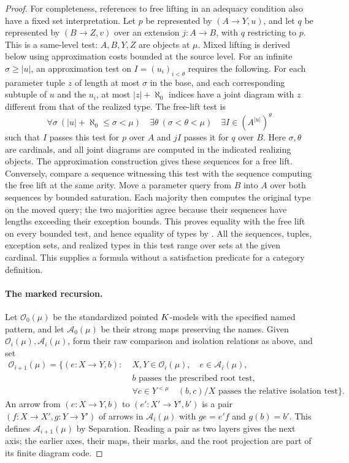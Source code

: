 \begin{proof}
For completeness, references to free lifting in an adequacy condition
also have a fixed set interpretation.  Let $p$ be represented by
$(A\to Y,u)$, and let $q$ be represented by $(B\to Z,v)$ over an extension
$j\colon A\to B$, with $q$ restricting to $p$.  This is a same-level
test: $A,B,Y,Z$ are objects at $\mu$.  Mixed lifting is derived below
using approximation costs bounded at the source level.  For an infinite
$\sigma\ge |u|$, an approximation test on
$I=(u_i)_{i<\theta}$ requires the following.  For each parameter tuple
$z$ of length at most $\sigma$ in the base, and each corresponding
subtuple of $u$ and the $u_i$, at most $|z|+\aleph_0$ indices have a
joint diagram with $z$ different from that of the realized type.
The free-lift test is
\[
 \forall\sigma\ (|u|+\aleph_0\le\sigma<\mu)\quad
 \exists\theta\ (\sigma<\theta<\mu)\quad
 \exists I\in(A^{|u|})^\theta
\]
such that $I$ passes this test for $p$ over $A$ and $jI$ passes it
for $q$ over $B$.  Here $\sigma,\theta$ are cardinals, and all joint
diagrams are computed in the indicated realizing objects.
The approximation construction gives these sequences for a free lift.
Conversely, compare a sequence witnessing this test with the sequence
computing the free lift at the same arity.  Move a parameter query from
$B$ into $A$ over both sequences by bounded saturation.  Each majority
then computes the original type on the moved query; the two majorities
agree because their sequences have lengths exceeding their exception
bounds.  This proves equality with the free lift on every bounded test,
and hence equality of types by .
All the sequences, tuples, exception sets, and realized types in this
test range over sets at the given cardinal.  This supplies a formula
without a satisfaction predicate for a category definition.

\paragraph{The marked recursion.}
Let $\mathcal O_0(\mu)$ be the standardized pointed $K$-models with the
specified named pattern, and let $\mathcal A_0(\mu)$ be their strong maps
preserving the names.  Given $\mathcal O_i(\mu),\mathcal A_i(\mu)$, form
their raw comparison and isolation relations as above, and set
\[
\begin{split}
\mathcal O_{i+1}(\mu)=
 \{(e\colon X\to Y,b):\;&X,Y\in\mathcal O_i(\mu),\quad
                         e\in\mathcal A_i(\mu),\\
 &b\text{ passes the prescribed root test},\\
 &\forall c\in Y^{<\mu}\quad
               (b,c)/X\text{ passes the relative isolation test}\}.
\end{split}
\]
An arrow from $(e\colon X\to Y,b)$ to
$(e'\colon X'\to Y',b')$ is a pair
$(f\colon X\to X',g\colon Y\to Y')$ of arrows in $\mathcal A_i(\mu)$
with $g e=e'f$ and $g(b)=b'$.  This defines
$\mathcal A_{i+1}(\mu)$ by Separation.  Reading a pair as two layers
gives the next axis; the earlier axes, their maps, their marks, and the
root projection are part of its finite diagram code.


\end{proof}
